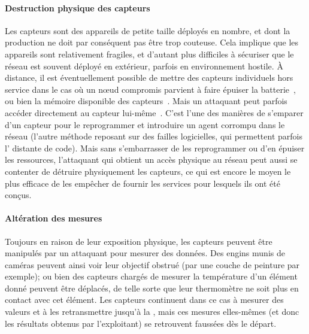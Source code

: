         \paragraph{Destruction physique des capteurs}
Les capteurs sont des appareils de petite taille déployés en nombre, et dont la production ne doit par conséquent pas être trop couteuse.
Cela implique que les appareils sont relativement fragiles, et d'autant plus difficiles à sécuriser que le réseau est souvent déployé en extérieur, parfois en environnement hostile.
À distance, il est éventuellement possible de mettre des capteurs individuels hors service dans le cas où un nœud compromis parvient à faire épuiser la batterie~\cite{MS14}, ou bien la mémoire disponible des capteurs~\cite{WS04}.
Mais un attaquant peut parfois accéder directement au capteur lui-même~\cite{GK13}.
C'est l'une des manières de s'emparer d'un capteur pour le reprogrammer et introduire un agent corrompu dans le réseau (l'autre méthode reposant sur des failles logicielles, qui permettent parfois l' distante de code).
Mais sans s'embarrasser de les reprogrammer ou d'en épuiser les ressources, l'attaquant qui obtient un accès physique au réseau peut aussi se contenter de détruire physiquement les capteurs, ce qui est encore le moyen le plus efficace de les empêcher de fournir les services pour lesquels ils ont été conçus.

        \paragraph{Altération des mesures}
Toujours en raison de leur exposition physique, les capteurs peuvent être manipulés par un attaquant pour mesurer des données.
Des engins munis de caméras peuvent ainsi voir leur objectif obstrué (par une couche de peinture par exemple); ou bien des capteurs chargés de mesurer la température d'un élément donné peuvent être déplacés, de telle sorte que leur thermomètre ne soit plus en contact avec cet élément.
Les capteurs continuent dans ce cas à mesurer des valeurs et à les retransmettre jusqu'à la \sdb, mais ces mesures elles-mêmes (et donc les résultats obtenus par l'exploitant) se retrouvent faussées dès le départ.

